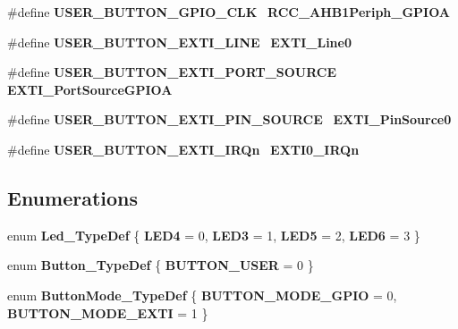 \begin{DoxyCompactItemize}
\item 
\#define \textbf{ U\+S\+E\+R\+\_\+\+B\+U\+T\+T\+O\+N\+\_\+\+G\+P\+I\+O\+\_\+\+C\+LK}~\textbf{ R\+C\+C\+\_\+\+A\+H\+B1\+Periph\+\_\+\+G\+P\+I\+OA}
\item 
\#define \textbf{ U\+S\+E\+R\+\_\+\+B\+U\+T\+T\+O\+N\+\_\+\+E\+X\+T\+I\+\_\+\+L\+I\+NE}~\textbf{ E\+X\+T\+I\+\_\+\+Line0}
\item 
\#define \textbf{ U\+S\+E\+R\+\_\+\+B\+U\+T\+T\+O\+N\+\_\+\+E\+X\+T\+I\+\_\+\+P\+O\+R\+T\+\_\+\+S\+O\+U\+R\+CE}~\textbf{ E\+X\+T\+I\+\_\+\+Port\+Source\+G\+P\+I\+OA}
\item 
\#define \textbf{ U\+S\+E\+R\+\_\+\+B\+U\+T\+T\+O\+N\+\_\+\+E\+X\+T\+I\+\_\+\+P\+I\+N\+\_\+\+S\+O\+U\+R\+CE}~\textbf{ E\+X\+T\+I\+\_\+\+Pin\+Source0}
\item 
\#define \textbf{ U\+S\+E\+R\+\_\+\+B\+U\+T\+T\+O\+N\+\_\+\+E\+X\+T\+I\+\_\+\+I\+R\+Qn}~\textbf{ E\+X\+T\+I0\+\_\+\+I\+R\+Qn}
\end{DoxyCompactItemize}
\subsection*{Enumerations}
\begin{DoxyCompactItemize}
\item 
enum \textbf{ Led\+\_\+\+Type\+Def} \{ \textbf{ L\+E\+D4} = 0, 
\textbf{ L\+E\+D3} = 1, 
\textbf{ L\+E\+D5} = 2, 
\textbf{ L\+E\+D6} = 3
 \}
\item 
enum \textbf{ Button\+\_\+\+Type\+Def} \{ \textbf{ B\+U\+T\+T\+O\+N\+\_\+\+U\+S\+ER} = 0
 \}
\item 
enum \textbf{ Button\+Mode\+\_\+\+Type\+Def} \{ \textbf{ B\+U\+T\+T\+O\+N\+\_\+\+M\+O\+D\+E\+\_\+\+G\+P\+IO} = 0, 
\textbf{ B\+U\+T\+T\+O\+N\+\_\+\+M\+O\+D\+E\+\_\+\+E\+X\+TI} = 1
 \}
\end{DoxyCompactItemize}
